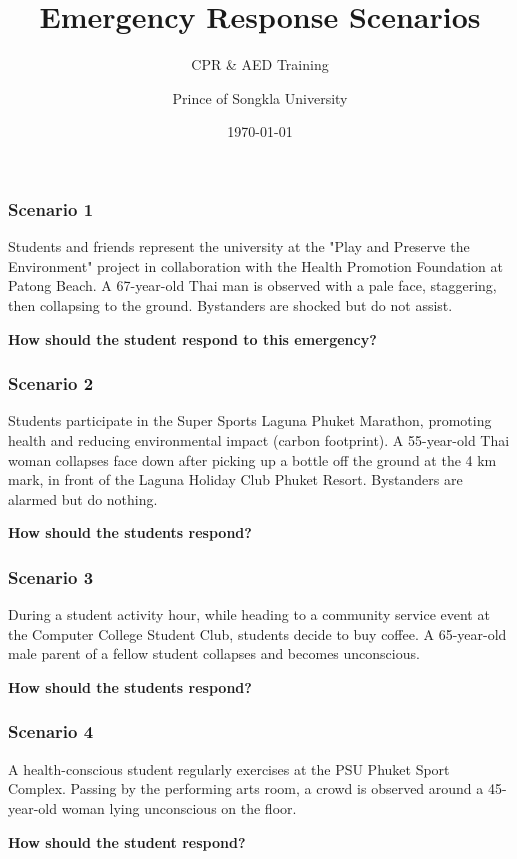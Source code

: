 \documentclass{beamer}
\title{Emergency Response Scenarios}
\subtitle{CPR \& AED Training}
\author{Prince of Songkla University}
\date{\today}
\begin{document}
\frame{\titlepage}

\begin{frame}
\frametitle{Scenario 1}
Students and friends represent the university at the "Play and Preserve the Environment" project in collaboration with the Health Promotion Foundation at Patong Beach. A 67-year-old Thai man is observed with a pale face, staggering, then collapsing to the ground. Bystanders are shocked but do not assist. 

\textbf{How should the student respond to this emergency?}
\end{frame}

\begin{frame}
\frametitle{Scenario 2}
Students participate in the Super Sports Laguna Phuket Marathon, promoting health and reducing environmental impact (carbon footprint). A 55-year-old Thai woman collapses face down after picking up a bottle off the ground at the 4 km mark, in front of the Laguna Holiday Club Phuket Resort. Bystanders are alarmed but do nothing.

\textbf{How should the students respond?}
\end{frame}

\begin{frame}
\frametitle{Scenario 3}
During a student activity hour, while heading to a community service event at the Computer College Student Club, students decide to buy coffee. A 65-year-old male parent of a fellow student collapses and becomes unconscious.

\textbf{How should the students respond?}
\end{frame}

\begin{frame}
\frametitle{Scenario 4}
A health-conscious student regularly exercises at the PSU Phuket Sport Complex. Passing by the performing arts room, a crowd is observed around a 45-year-old woman lying unconscious on the floor.

\textbf{How should the student respond?}
\end{frame}
\end{document}
